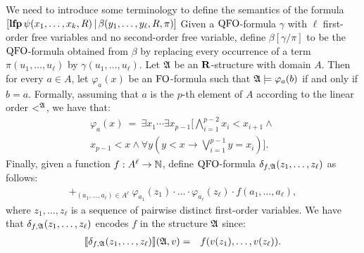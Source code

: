 We need to introduce some terminology to define the semantics of the formula $[{\bf lfp} \, \psi(x_1,\ldots,x_k,R) \, | \, \beta(y_1, \ldots, y_\ell, R, \pi)]$
Given a ${\rm QFO}$-formula $\gamma$ with $\ell$ first-order free variables and no second-order free variable, define $\beta[\gamma/\pi]$ to be the ${\rm QFO}$-formula obtained from $\beta$ by replacing every occurrence of a term $\pi(u_1, \ldots, u_\ell)$ by $\gamma(u_1, \ldots, u_\ell)$.
Let $\mathfrak{A}$ be an $\mathbf{R}$-structure with domain $A$. Then for every $a \in A$, let $\varphi_a(x)$ be an ${\rm FO}$-formula such that $\mathfrak{A} \models \varphi_a(b)$ if and only if $b = a$. Formally, assuming that $a$ is the $p$-th element of $A$ according to the linear order $<^{\mathfrak{A}}$, we have that:
\begin{multline*}
\varphi_a(x) \ = \ \exists x_1 \cdots \exists x_{p-1}\bigg[\bigwedge_{i =1}^{p-2}x_i < x_{i+1} \wedge\,\\  
x_{p-1} < x  \wedge \forall y(y < x \to \bigvee_{i = 1}^{p-1} y = x_i)\bigg].
\end{multline*}
Finally, given a function $f : A^\ell \to \mathbb{N}$, define ${\rm QFO}$-formula $\delta_{f,\mathfrak{A}}(z_1, \ldots, z_\ell)$ as follows:
\begin{multline*}
 \mathop{+}_{(a_1,\ldots,a_{\ell})\in A^{\ell}} \ \varphi_{a_1}(z_1) \cdot \ldots \cdot \varphi_{a_{\ell}}(z_{\ell})\cdot f(a_1,\ldots,a_{\ell}), 
\end{multline*}
where $z_1, \ldots, z_\ell$ is a sequence of pairwise distinct first-order variables.
We have that $\delta_{f,\mathfrak{A}}(z_1, \ldots, z_\ell)$ encodes $f$ in the structure $\mathfrak{A}$ since:
\begin{eqnarray*}
{\llbracket{}{\delta_{f,\mathfrak{A}}(z_1, \ldots, z_\ell)}\rrbracket}(\mathfrak{A},v)  & = & f(v(z_1), \ldots, v(z_\ell)).
\end{eqnarray*}
